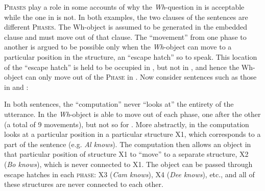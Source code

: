 \textsc{Phases} play a role in some accounts of why the \textit{Wh}-question in  is acceptable while the one in  is not. In both examples, the two clauses of the sentences are different \textsc{Phases}. The Wh-object is assumed to be generated in the embedded clause and must move out of that clause. The “movement” from one phase to another is argued to be possible only when the \textit{Wh}-object can move to a particular position in the structure, an “escape hatch” so to speak. This location of the “escape hatch” is held to be occupied in , but not in , and hence the Wh-object can only move out of the \textsc{Phase} in . Now consider sentences such as those in  and : 

\ea\label{ex:5:x3}
\label{ex:5:x3a}
\label{ex:5:x3b}
\z
\z

\ea\label{ex:5:x4}
\label{ex:5:x4a}
\label{ex:5:x4b}
\z
\z

  In both sentences, the “computation” never “looks at” the entirety of the utterance. In  the \textit{Wh}-object is able to move out of each phase, one after the other (a total of 9 movements), but not so for . More abstractly, in  the computation looks at a particular position in a particular structure X1, which corresponds to a part of the sentence (e.g. \textit{Al knows}). The computation then allows an object in that particular position of structure X1 to “move” to a separate structure, X2 (\textit{Bo knows}), which is never connected to X1. The object can be passed through escape hatches in each \textsc{phase}: X3 (\textit{Cam knows}), X4 (\textit{Dee knows}), etc., and all of these structures are never connected to each other.
  
